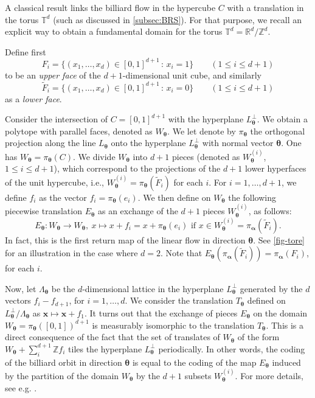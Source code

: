 \documentclass{article}
\theoremstyle{definition}
\newcommand{\Z}{\mathbb{Z}}
\newcommand{\btheta}{\boldsymbol{\theta}}
\newcommand{\balpha}{\boldsymbol{\alpha}}
\begin{document}
 A classical result links the billiard flow in the hypercube $C$ with a translation    in the torus $\mathbb T^{d}$  (such as discussed in \cref{subsec:BRS}).
 For that  purpose, we  recall an explicit way   to obtain  a fundamental domain for the torus $\mathbb T^{d}=\mathbb R^{d}/\mathbb Z^{d}$. 
 
 Define first 
$$
F_i = \{(x_1,\dots,x_d) \in [0,1]^{d+1}\,:\, x_i = 1\} \qquad (1 \le i \le d+1)
$$
to be an \emph{upper face} of the $d+1$-dimensional unit cube,  and similarly 
\[ 
\tilde{F}_i = \{(x_1,\dots,x_d) \in [0,1]^{d+1}\,:\, x_i = 0\}  \qquad (1 \le i \le d+1)
\]
as a \emph{lower face}.  


Consider the intersection of $C=[0,1]^{d+1}$ with the hyperplane $L_{\btheta}^\perp$. We obtain a polytope with parallel faces, denoted as $W_{\btheta}$.
 We
let  denote by $\pi_{\btheta}$ the orthogonal projection  along  the line  $L_{\btheta}$ onto  the  hyperplane  $L_{\btheta}^\perp$ with normal vector $\btheta$.
One has  $W_{\btheta}=\pi_{\btheta} (C)$.
We divide  $W_{\btheta}$ into $d+1$ pieces (denoted as  $W_{\btheta} ^{(i)}$, $1  \leq i \leq d+1$), which correspond to the projections of the $d+1$ lower hyperfaces of the unit hypercube, i.e., $W_{\btheta} ^{(i)}=\pi_{\btheta} (\tilde{F}_i)$ for each $i$. For $i=1,\ldots,d+1$,   we define $f_i$  as the  vector  $f_i=\pi_{\btheta}(e_i)$. 
We  then  define on  $W_{\btheta}$  the following  piecewise translation  $E_{\btheta}$ as an exchange of the  $d+1$ pieces $W_{\btheta} ^{(i)}$, as follows: 
\begin{equation} \label{eq:exchange}E_{\btheta}\colon W_{\btheta} \rightarrow W_{\btheta}, \ x \mapsto x + f_i = x + \pi_{\btheta}(e_i) \mbox{ if  } x\in  W_{\btheta} ^{(i)}= \pi_{\balpha}  (\tilde{F}_i).\end{equation}
 In fact, this is the first return map of the linear flow in direction $\btheta$.  See \cref{fig-tore} for an illustration in the case where $d=2$.
 Note that $E_{\btheta} (
\pi_{\balpha}  (\tilde{F}_i))= \pi_{\balpha}  ({F}_i)$, for  each $i$.


Now, let $\Lambda_{\btheta}$  be  the $d$-dimensional lattice
in  the  hyperplane  $L_{\btheta}^\perp$ generated by  the $d$ vectors $f_i- f_{d+1}$, for 
$i=1,\ldots,d$. We consider the  translation $T_{\btheta}$ defined on  $L_{\btheta}^\perp/\Lambda_{\btheta} $ as $ {\mathbf x} \mapsto  {\mathbf x}+f_1$.
It turns out that the   exchange of pieces $E_{\btheta}$  on 
the domain   $W_{\btheta}=\pi_{\btheta}([0,1])^{d+1}$ is   measurably isomorphic to  the   translation $T_{\btheta}$.
This is  a direct consequence  of the fact that  the set of  translates of $W_{\btheta}$ of the form   $W_{\btheta} + \sum_{i}^{d+1} \Z f_i$  tiles the hyperplane   $L_{\btheta}^\perp$
periodically.
In other words, the coding of the billiard orbit in direction $\btheta$ is equal to the 
  coding of the map $E_{\btheta}$ induced by  the partition of the domain $W_{\btheta}$ by  the  $d+1$  subsets $W_{\btheta}^{(i)}$.
  For more details, see e.g.  \cite{BCCSY}.
\end{document}
